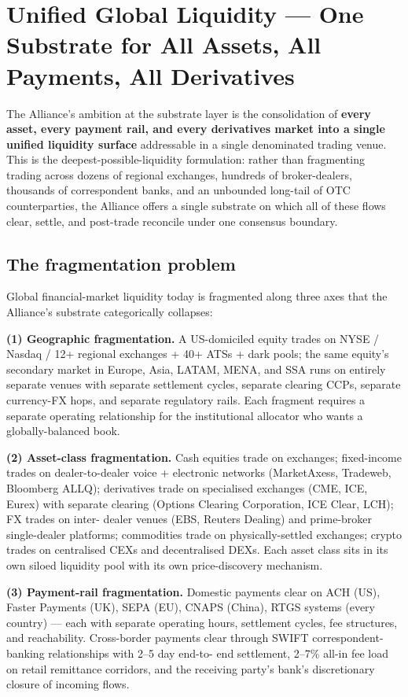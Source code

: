 \section{Unified Global Liquidity --- One Substrate for All Assets, All Payments, All Derivatives}

The Alliance's ambition at the substrate layer is the consolidation of
\textbf{every asset, every payment rail, and every derivatives market
into a single unified liquidity surface} addressable in a single
denominated trading venue. This is the deepest-possible-liquidity
formulation: rather than fragmenting trading across dozens of regional
exchanges, hundreds of broker-dealers, thousands of correspondent banks,
and an unbounded long-tail of OTC counterparties, the Alliance offers a
single substrate on which all of these flows clear, settle, and
post-trade reconcile under one consensus boundary.

\subsection{The fragmentation problem}

Global financial-market liquidity today is fragmented along three axes
that the Alliance's substrate categorically collapses:

\textbf{(1) Geographic fragmentation.} A US-domiciled equity trades on
NYSE / Nasdaq / 12+ regional exchanges + 40+ ATSs + dark pools; the
same equity's secondary market in Europe, Asia, LATAM, MENA, and SSA
runs on entirely separate venues with separate settlement cycles,
separate clearing CCPs, separate currency-FX hops, and separate
regulatory rails. Each fragment requires a separate operating relationship
for the institutional allocator who wants a globally-balanced book.

\textbf{(2) Asset-class fragmentation.} Cash equities trade on
exchanges; fixed-income trades on dealer-to-dealer voice + electronic
networks (MarketAxess, Tradeweb, Bloomberg ALLQ); derivatives trade on
specialised exchanges (CME, ICE, Eurex) with separate clearing
(Options Clearing Corporation, ICE Clear, LCH); FX trades on inter-
dealer venues (EBS, Reuters Dealing) and prime-broker single-dealer
platforms; commodities trade on physically-settled exchanges; crypto
trades on centralised CEXs and decentralised DEXs. Each asset class
sits in its own siloed liquidity pool with its own price-discovery
mechanism.

\textbf{(3) Payment-rail fragmentation.} Domestic payments clear on
ACH (US), Faster Payments (UK), SEPA (EU), CNAPS (China), RTGS systems
(every country) --- each with separate operating hours, settlement
cycles, fee structures, and reachability. Cross-border payments clear
through SWIFT correspondent-banking relationships with 2--5 day end-to-
end settlement, 2--7\% all-in fee load on retail remittance corridors,
and the receiving party's bank's discretionary closure of incoming
flows.


